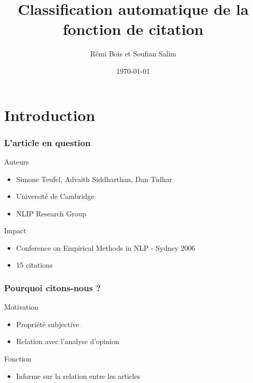 \documentclass[10pt]{beamer}
\title{Classification automatique de la fonction de citation}
\author{Rémi Bois et Soufian Salim}
\date{\today}
\begin{document}
\begin{frame}
  \maketitle
\end{frame}

\section{Introduction}
\label{sec:intro}

\begin{frame}
  \frametitle{L'article en question}
  
  \begin{block}{Auteurs}
  \begin{itemize}
    \item Simone Teufel, Advaith Siddharthan, Dan Tidhar
    \item Université de Cambridge
    \item NLIP Research Group
  \end{itemize}
  \end{block}

  \begin{block}{Impact}
  \begin{itemize}
    \item Conference on Empirical Methods in NLP - Sydney 2006
    \item 15 citations
  \end{itemize}
  \end{block}
\end{frame}

\begin{frame}
  \frametitle{Pourquoi citons-nous ?}

  \begin{block}{Motivation}
  \begin{itemize}
    \item Propriété subjective
    \item Relation avec l'analyse d'opinion
  \end{itemize}
  \end{block}

  \begin{block}{Fonction}
  \begin{itemize}
    \item Informe sur la relation entre les articles
  \end{itemize}
  \end{block}
\end{frame}
\end{document}
